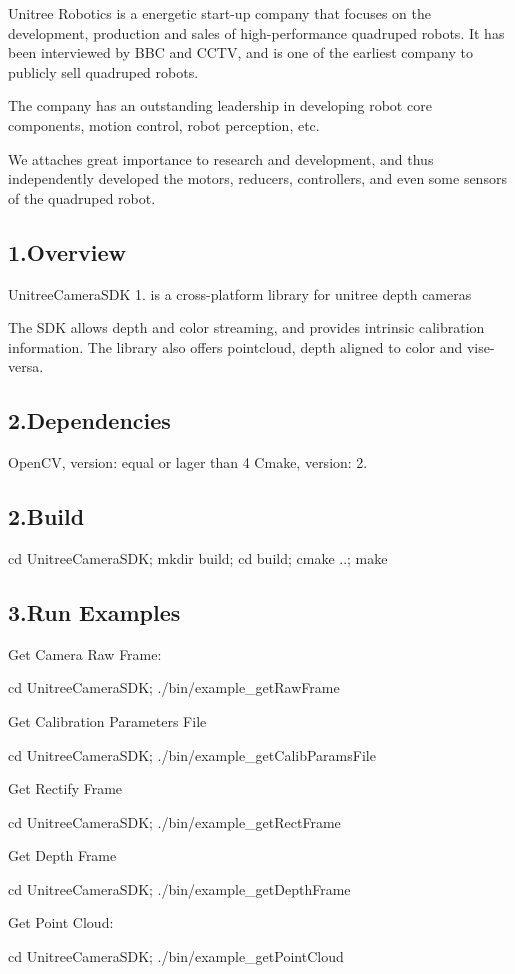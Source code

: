 Unitree Robotics is a energetic start-\/up company that focuses on the development, production and sales of high-\/performance quadruped robots. It has been interviewed by B\+BC and C\+C\+TV, and is one of the earliest company to publicly sell quadruped robots.

The company has an outstanding leadership in developing robot core components, motion control, robot perception, etc.

We attaches great importance to research and development, and thus independently developed the motors, reducers, controllers, and even some sensors of the quadruped robot.

\subsection*{1.\+Overview }

Unitree\+Camera\+S\+DK 1. is a cross-\/platform library for unitree depth cameras

The S\+DK allows depth and color streaming, and provides intrinsic calibration information. The library also offers pointcloud, depth aligned to color and vise-\/versa.

\subsection*{2.\+Dependencies }

Open\+CV, version\+: equal or lager than 4 Cmake, version\+: 2.

\subsection*{2.\+Build }


\begin{DoxyCode}
cd UnitreeCameraSDK;
mkdir build; cd build;
cmake ..; make
\end{DoxyCode}


\subsection*{3.\+Run Examples }

Get Camera Raw Frame\+: 
\begin{DoxyCode}
cd UnitreeCameraSDK; 
./bin/example\_getRawFrame 
\end{DoxyCode}


Get Calibration Parameters File 
\begin{DoxyCode}
cd UnitreeCameraSDK;
./bin/example\_getCalibParamsFile 
\end{DoxyCode}


Get Rectify Frame 
\begin{DoxyCode}
cd UnitreeCameraSDK;
./bin/example\_getRectFrame
\end{DoxyCode}


Get Depth Frame 
\begin{DoxyCode}
cd UnitreeCameraSDK;
./bin/example\_getDepthFrame
\end{DoxyCode}


Get Point Cloud\+: 
\begin{DoxyCode}
cd UnitreeCameraSDK; 
./bin/example\_getPointCloud
\end{DoxyCode}
 